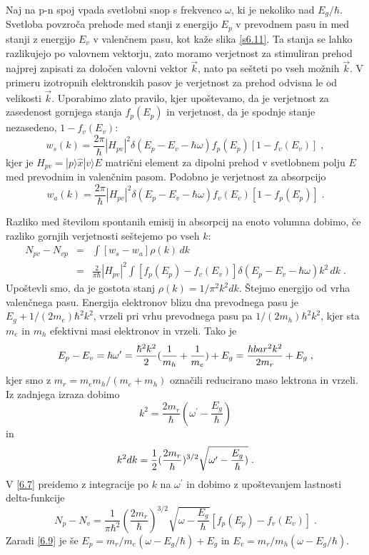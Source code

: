 Naj na p-n spoj vpada svetlobni snop s frekvenco $\omega$, ki je nekoliko
nad $E_g/\hbar$. Svetloba povzroča prehode med stanji z energijo $E_p$ v
prevodnem pasu in med stanji z energijo $E_v$ v valenčnem pasu, kot kaže
slika \ref{s6.11}. Ta stanja se lahko razlikujejo po valovnem vektorju, zato
moramo verjetnost za stimuliran prehod najprej zapisati za določen valovni
vektor $\vec{k}$, nato pa sešteti po vseh možnih $\vec{k}$. V primeru
izotropnih elektronskih pasov je verjetnost za prehod odvisna le od
velikosti $\vec{k}$. Uporabimo zlato pravilo, kjer upoštevamo, da je
verjetnost za zasedenost gornjega stanja $f_p(E_p)$ in verjetnost, da je
spodnje stanje nezasedeno, $1-f_v(E_v)$: 
\begin{equation}  \label{6.5}
w_s(k)=\frac{2\pi}{\hbar}|H_{pv}|^2\delta(E_p-E_v- \hbar\omega)
f_p(E_p)[1-f_v(E_v)]\;,
\end{equation}
kjer je $H_{pv}= |p\rangle \hat{x}|v\rangle E $ matrični element za dipolni
prehod v svetlobnem polju $E$ med prevodnim in valenčnim pasom. Podobno je
verjetnost za absorpcijo 
\begin{equation}  \label{6.6}
w_a(k)=\frac{2\pi}{\hbar}|H_{pv}|^2\delta(E_p-E_v- \hbar\omega)
f_v(E_v)[1-f_p(E_p)]\;.
\end{equation}

Razliko med številom spontanih emisij in absorpcij na enoto volumna dobimo,
če razliko gornjih verjetnosti seštejemo po vseh $k$: 
\begin{eqnarray}  \label{6.7}
N_{pv}-N_{vp}&=&\int[w_s-w_a]\rho(k)\,dk  \nonumber \\
&=&\frac{2}{\pi\hbar}|H_{pv}|^2 \int[f_p(E_p)-f_v(E_v)]
\delta(E_p-E_v-\hbar\omega) k^2\,dk\;.
\end{eqnarray}
Upoštevli smo, da je gostota stanj $\rho(k)=1/\pi^2 k^2dk$. Štejmo
energijo od vrha valenčnega pasu. Energija elektronov blizu dna prevodnega
pasu je $E_g+1/(2m_e)\hbar^2 k^2$, vrzeli pri vrhu prevodnega pasu pa $%
1/(2m_h)\hbar^2 k^2$, kjer sta $m_e$ in $m_h$ efektivni masi elektronov in
vrzeli. Tako je 
\begin{equation}  \label{6.8}
E_p-E_v=\hbar\omega^{\prime}=\frac{\hbar^2 k^2}{2}(\frac{1}{m_h}+ \frac{1}{%
m_e})+E_g=\frac{hbar^2 k^2}{2m_r}+E_g\;,
\end{equation}
kjer smo z $m_r=m_e m_h/(m_e+m_h)$ označili reducirano maso lektrona in
vrzeli. Iz zadnjega izraza dobimo 
\begin{equation}  \label{6.9}
k^2=\frac{2m_r}{\hbar}(\omega^{\prime}-\frac{E_g}{\hbar})
\end{equation}
in 
\begin{equation}  \label{6.10}
k^2dk=\frac{1}{2}(\frac{2m_r}{\hbar})^{3/2}\sqrt{\omega^{\prime}- \frac{E_g}{%
\hbar})}\;.
\end{equation}
V \ref{6.7} preidemo z integracije po $k$ na $\omega^{\prime}$ in dobimo z
upoštevanjem lastnosti delta-funkcije 
\begin{equation}  \label{6.11}
N_p-N_v=\frac{1}{\pi\hbar^2}(\frac{2m_r}{\hbar})^{3/2} \sqrt{\omega-\frac{E_g%
}{\hbar}}[f_p(E_p)-f_v(E_v)]\;.
\end{equation}
Zaradi \ref{6.9} je še $E_p=m_r/m_e(\omega-E_g/\hbar)+E_g$ in $%
E_v=m_r/m_h(\omega-E_g/\hbar)$.

